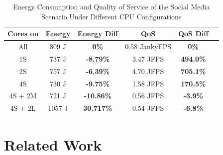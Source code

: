 \documentclass[conference]{IEEEtran}
\begin{document}
\begin{table}
\renewcommand{\arraystretch}{1.3}
\caption{Energy Consumption and Quality of Service of the Social Media Scenario Under Different CPU Configurations}
\label{tab:energymusic}
\centering
\begin{tabular}{|c|c|c|c|c|c|}
\hline
\textbf{Cores on} & \textbf{Energy} & \textbf{Energy Diff} &  \textbf{QoS} & \textbf{QoS Diff} \\
\hline
      All &  809 J &     \textbf{0\%}  & 0.58 JankyFPS & \textbf{0\%} \\ 
      1S & 737 J & \textbf{-8.79\%} & 3.47 JFPS & \textbf{494.0\%} \\
      2S & 757 J & \textbf{-6.39\%} & 4.70 JFPS & \textbf{705.1\%} \\
      4S & 730 J & \textbf{-9.75\%} & 1.58 JFPS & \textbf{170.5\%} \\
      4S + 2M & 721 J & \textbf{-10.86\%} & 0.56 JFPS & \textbf{-3.9\%}\\
      4S + 2L & 1057 J &  \textbf{30.717\%} & 0.54 JFPS & \textbf{-6.8\%}\\
      
      \hline
\end{tabular}
\end{table}



\section{Related Work} \label{sec:relatedwork}
\end{document}
